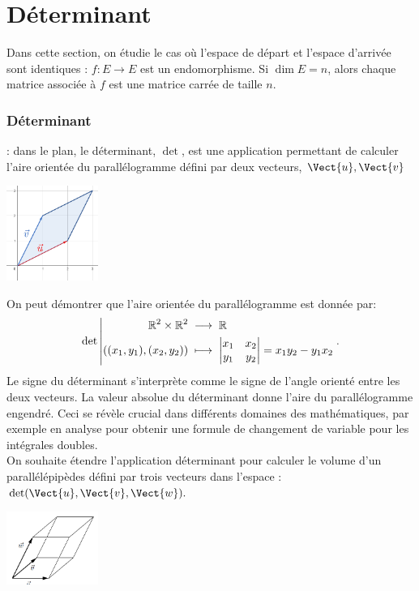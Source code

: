 \documentclass{book}
\begin{document}
\chapter*{Déterminant}


Dans cette section, on étudie le cas où l'espace de départ et l'espace d'arrivée sont identiques : $f : E\to E$ est un
endomorphisme. Si $\dim E = n$, alors chaque matrice associée à $f$ est une matrice carrée de taille $n$.
\subsection{Déterminant}
 : dans le plan, le déterminant, $\det$, est une application permettant de calculer l'aire orientée du parallélogramme défini par deux vecteurs, $\Vect{u},\Vect{v}$  
\begin{center}
\includegraphics[width=3cm]{determinant.png}
\end{center}
On peut démontrer que l'aire orientée du parallélogramme est donnée par:  
$$
{\mathop{\mathrm{det}}\nolimits}\left|\begin{aligned}{\mathbb{R}^2\times\mathbb{R}^2}&\;\longrightarrow\;{\mathbb{R}}\\{((x_1,y_1),(x_2,y_2))}&\;\longmapsto\;{\begin{vmatrix}
x_1 & x_2 \\
y_1 & y_2
\end{vmatrix}=x_1y_2-y_1x_2}\end{aligned}\right..
$$
Le signe du déterminant s'interprète comme le signe de l'angle orienté entre les deux vecteurs. La valeur absolue du déterminant donne l'aire du parallélogramme engendré. Ceci se révèle crucial dans
différents domaines des mathématiques, par exemple en analyse pour obtenir une formule de changement de variable pour les intégrales doubles.\\
On souhaite étendre l'application déterminant pour calculer le volume d'un parallélépipèdes défini par trois vecteurs dans l'espace : $\det(\Vect{u},\Vect{v},\Vect{w}).$
\begin{center}
\includegraphics[width=3cm]{determinant3.png}
\end{center}
\end{document}
